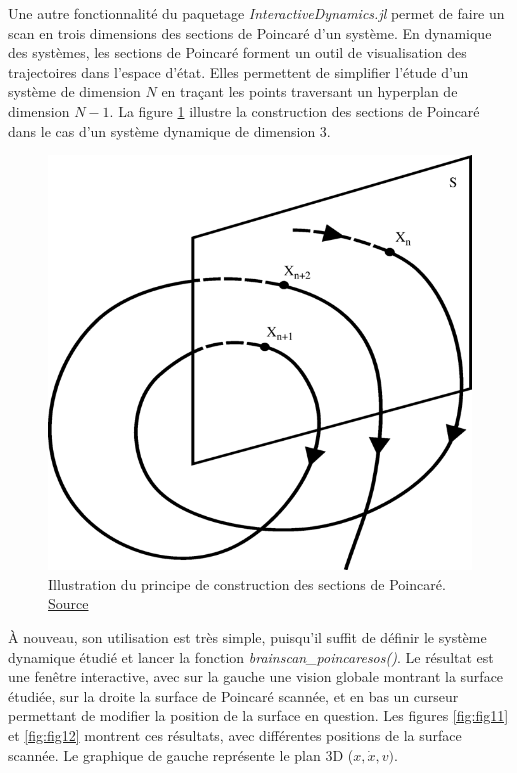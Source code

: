 \documentclass[a4paper, french, 12pt, titlepage]{article}
\begin{document}
Une autre fonctionnalité du paquetage \emph{InteractiveDynamics.jl} permet de faire un scan en trois dimensions des sections de Poincaré d'un système.
En dynamique des systèmes, les sections de Poincaré forment un outil de visualisation des trajectoires dans l'espace d'état.
Elles permettent de simplifier l'étude d'un système de dimension $N$ en traçant les points traversant un hyperplan de dimension $N-1$.
La figure \ref{fig:poincare} illustre la construction des sections de Poincaré dans le cas d'un système dynamique de dimension 3.
\begin{figure}
  \centering
  \includegraphics[scale=0.5]{poincare_section.png}
  \caption{Illustration du principe de construction des sections de Poincaré. \href{https://journals.openedition.org/bibnum/1055}{Source}}
  \label{fig:poincare}
\end{figure}
À nouveau, son utilisation est très simple, puisqu'il suffit de définir le système dynamique étudié et lancer la fonction \emph{brainscan\_poincaresos()}.
Le résultat est une fenêtre interactive, avec sur la gauche une vision globale montrant la surface étudiée, sur la droite la surface de Poincaré scannée, et en bas un curseur permettant de modifier la position de la surface en question.
Les figures \ref{fig:fig11} et \ref{fig:fig12} montrent ces résultats, avec différentes positions de la surface scannée.
Le graphique de gauche représente le plan 3D ($x, \dot{x}, v)$.\\
\end{document}
